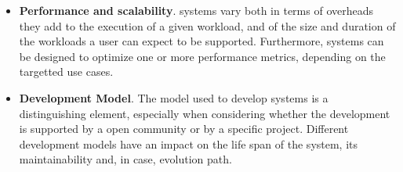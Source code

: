 \documentclass{sig-alternate}
\begin{document}
\begin{itemize}
\item \textbf{Performance and scalability}. \pilot systems vary both in
  terms of overheads they add to the execution of a given workload, and of the
  size and duration of the workloads a user can expect to be supported.
  Furthermore, \pilot systems can be designed to optimize one or more
  performance metrics, depending on the targetted use cases.

\item \textbf{Development Model}. The model used to develop \pilot systems is a
  distinguishing element, especially when considering whether the development
  is supported by a open community or by a specific project. Different
  development models have an impact on the life span of the \pilot system, its
  maintainability and, in case, evolution path.

\end{itemize}
\end{document}
